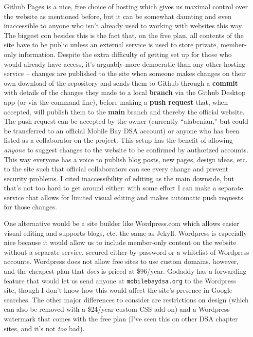 \documentclass[
]{book}
\begin{document}
Github Pages is a nice, free choice of hosting which gives us maximal control over the website as mentioned before, but it can be somewhat daunting and even inaccessible to anyone who isn't already used to working with websites this way. The biggest con besides this is the fact that, on the free plan, all contents of the site have to be public unless an external service is used to store private, member-only information. Despite the extra difficulty of getting set up for those who would already have access, it's arguably more democratic than any other hosting service -- changes are published to the site when someone makes changes on their own download of the repository and sends them to Github through a \textbf{commit} with details of the changes they made to a local \textbf{branch} via the Github Desktop app (or via the command line), before making a \textbf{push request} that, when accepted, will publish them to the \textbf{main} branch and thereby the official website. The push request can be accepted by the owner (currently ``alabenian,'' but could be transferred to an official Mobile Bay DSA account) or anyone who has been listed as a collaborator on the project. This setup has the benefit of allowing \emph{anyone} to suggest changes to the website to be confirmed by authorized accounts. This way everyone has a voice to publish blog posts, new pages, design ideas, etc. to the site such that official collaborators can see every change and prevent security problems. I cited inaccessibility of editing as the main downside, but that's not too hard to get around either: with some effort I can make a separate service that allows for limited visual editing and makes automatic push requests for those changes.

One alternative would be a site builder like Wordpress.com which allows easier visual editing and supports blogs, etc. the same as Jekyll. Wordpress is especially nice because it would allow us to include member-only content on the website without a separate service, secured either by password or a whitelist of Wordpress accounts. Wordpress does not allow free sites to use custom domains, however, and the cheapest plan that \emph{does} is priced at \$96/year. Godaddy has a forwarding feature that would let us send anyone at \texttt{mobilebaydsa.org} to the Wordpress site, though I don't know how this would affect the site's presence in Google searches. The other major differences to consider are restrictions on design (which can also be removed with a \$24/year custom CSS add-on) and a Wordpress watermark that comes with the free plan (I've seen this on other DSA chapter sites, and it's not \emph{too} bad).
\end{document}
